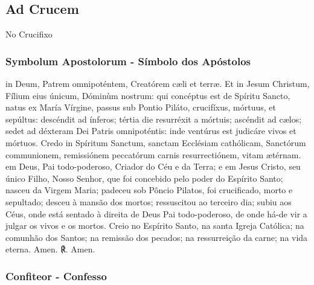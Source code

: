 \emph{}

\subsection{Ad Crucem}
\begin{nscenter}No Crucifixo\end{nscenter}
\subsubsection{Symbolum Apostolorum - Símbolo dos Apóstolos}
\begin{paracol}{2}
 in Deum, Patrem omnipoténtem, Creatórem cæli et terræ. Et in Jesum Christum, Fílium eius únicum, Dóminùm nostrum: qui concéptus est de Spíritu Sancto, natus ex María Vírgine, passus sub Pontio Piláto, crucifíxus, mórtuus, et sepúltus: descéndit ad ínferos; tértia die resurréxit a mórtuis; ascéndit ad cælos; sedet ad déxteram Dei Patris omnipoténtis: inde ventúrus est judicáre vivos et mórtuos. Credo in Spíritum Sanctum, sanctam Ecclésiam cathólicam, Sanctórum communionem, remissiónem peccatórum carnis resurrectiónem, vitam ætérnam.
\switchcolumn
{} em Deus, Pai todo-poderoso, Criador do Céu e da Terra; e em Jesus Cristo, seu único Filho, Nosso Senhor, que foi concebido pelo poder do Espírito Santo; nasceu da Virgem Maria; padeceu sob Pôncio Pilatos, foi crucificado, morto e sepultado; desceu à mansão dos mortos; ressuscitou ao terceiro dia; subiu aos Céus, onde está sentado à direita de Deus Pai todo-poderoso, de onde há-de vir a julgar os vivos e os mortos. Creio no Espírito Santo, na santa Igreja Católica; na comunhão dos Santos; na remissão dos pecados; na ressurreição da carne; na vida eterna.
 Amen.
\switchcolumn
{\redx ℟.} Amen.
\end{paracol}

\pagebreak [3]

\subsubsection{Confiteor - Confesso}

\emph{}

